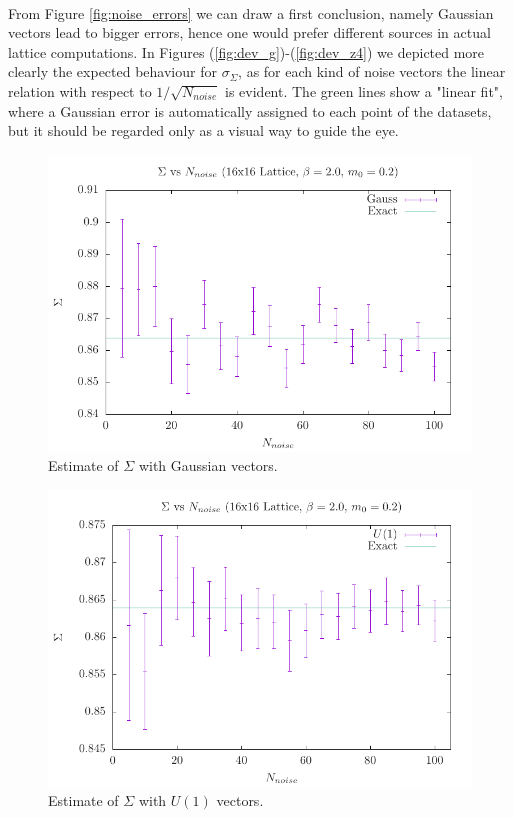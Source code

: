 \\ From Figure \ref{fig:noise_errors} we can draw a first conclusion, namely Gaussian vectors lead to bigger errors, hence one would prefer different sources in actual lattice computations.
In Figures (\ref{fig:dev_g})-(\ref{fig:dev_z4}) we depicted more clearly the expected behaviour for $\sigma_\Sigma$, as for each kind of noise vectors the linear relation with respect to $1/\sqrt{N_{noise}}$ is evident. The green lines show a "linear fit", where a Gaussian error is automatically assigned to each point of the datasets, but it should be regarded only as a visual way to guide the eye.
\begin{figure}[H]
\centering
              \includegraphics[width=0.8\linewidth]{images/cc_g.pdf}
              \caption{Estimate of $\Sigma$ with Gaussian vectors.}
              \label{fig:cc_g}
\end{figure}
\begin{figure}[H]
\centering
              \includegraphics[width=0.8\linewidth]{images/cc_u1.pdf}
              \caption{Estimate of $\Sigma$ with $U(1)$ vectors.}
              \label{fig:cc_u1}
\end{figure}
